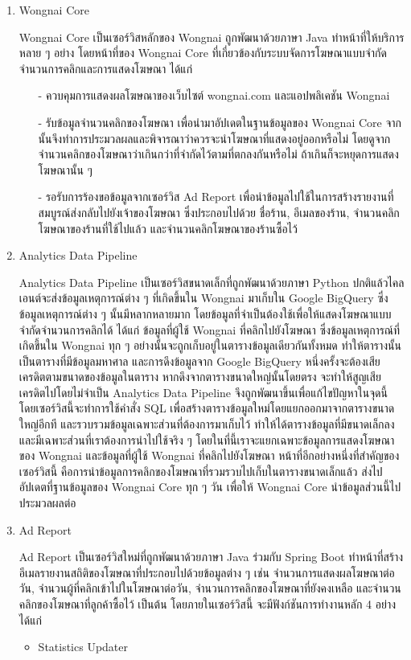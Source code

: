 \begin{enumerate}
	\item Wongnai Core
	
	Wongnai Core เป็นเซอร์วิสหลักของ Wongnai ถูกพัฒนาด้วยภาษา Java ทำหน้าที่ให้บริการหลาย ๆ อย่าง โดยหน้าที่ของ Wongnai Core ที่เกี่ยวข้องกับระบบจัดการโฆษณาแบบจำกัดจำนวนการคลิกและการแสดงโฆษณา ได้แก่ 
	\begin{itemize}
		\item[-] ควบคุมการแสดงผลโฆษณาของเว็บไซต์ wongnai.com และแอปพลิเคชัน Wongnai
		\item[-] รับข้อมูลจำนวนคลิกของโฆษณา เพื่อนำมาอัปเดตในฐานข้อมูลของ Wongnai Core จากนั้นจึงทำการประมวลผลและพิจารณาว่าควรจะนำโฆษณาที่แสดงอยู่ออกหรือไม่ โดยดูจากจำนวนคลิกของโฆษณาว่าเกินกว่าที่จำกัดไว้ตามที่ตกลงกันหรือไม่ ถ้าเกินก็จะหยุดการแสดงโฆษณานั้น ๆ
		\item[-] รอรับการร้องขอข้อมูลจากเซอร์วิส Ad Report เพื่อนำข้อมูลไปใช้ในการสร้างรายงานที่สมบูรณ์ส่งกลับไปยังเจ้าของโฆษณา ซึ่งประกอบไปด้วย ชื่อร้าน, อีเมลของร้าน, จำนวนคลิกโฆษณาของร้านที่ใช้ไปแล้ว และจำนวนคลิกโฆษณาของร้านซื้อไว้
	\end{itemize}
	\item Analytics Data Pipeline
	
	Analytics Data Pipeline เป็นเซอร์วิสขนาดเล็กที่ถูกพัฒนาด้วยภาษา Python ปกติแล้วไคลเอนต์จะส่งข้อมูลเหตุการณ์ต่าง ๆ ที่เกิดขึ้นใน Wongnai มาเก็บใน Google BigQuery ซึ่งข้อมูลเหตุการณ์ต่าง ๆ นั้นมีหลากหลายมาก โดยข้อมูลที่จำเป็นต้องใช้เพื่อให้แสดงโฆษณาแบบจำกัดจำนวนการคลิกได้ ได้แก่ ข้อมูลที่ผู้ใช้ Wongnai ที่คลิกไปยังโฆษณา ซึ่งข้อมูลเหตุการณ์ที่เกิดขึ้นใน Wongnai ทุก ๆ อย่างนั้นจะถูกเก็บอยู่ในตารางข้อมูลเดียวกันทั้งหมด ทำให้ตารางนั้นเป็นตารางที่มีข้อมูลมหาศาล และการดึงข้อมูลจาก Google BigQuery หนึ่งครั้งจะต้องเสียเครดิตตามขนาดของข้อมูลในตาราง หากดึงจากตารางขนาดใหญ่นั้นโดยตรง จะทำให้สูญเสียเครดิตไปโดยไม่จำเป็น Analytics Data Pipeline จึงถูกพัฒนาขึ้นเพื่อแก้ไขปัญหาในจุดนี้ โดยเซอร์วิสนี้จะทำการใช้คำสั่ง SQL เพื่อสร้างตารางข้อมูลใหม่โดยแยกออกมาจากตารางขนาดใหญ่อีกที และรวบรวมข้อมูลเฉพาะส่วนที่ต้องการมาเก็บไว้ ทำให้ได้ตารางข้อมูลที่มีขนาดเล็กลง และมีเฉพาะส่วนที่เราต้องการนำไปใช้จริง ๆ โดยในที่นี้เราจะแยกเฉพาะข้อมูลการแสดงโฆษณาของ Wongnai และข้อมูลที่ผู้ใช้ Wongnai ที่คลิกไปยังโฆษณา หน้าที่อีกอย่างหนึ่งที่สำคัญของเซอร์วิสนี้ คือการนำข้อมูลการคลิกของโฆษณาที่รวมรวบไปเก็บในตารางขนาดเล็กแล้ว ส่งไปอัปเดตที่ฐานข้อมูลของ Wongnai Core ทุก ๆ วัน เพื่อให้ Wongnai Core นำข้อมูลส่วนนี้ไปประมวลผลต่อ

	\item Ad Report
	
	Ad Report เป็นเซอร์วิสใหม่ที่ถูกพัฒนาด้วยภาษา Java ร่วมกับ Spring Boot ทำหน้าที่สร้างอีเมลรายงานสถิติของโฆษณาที่ประกอบไปด้วยข้อมูลต่าง ๆ เช่น จำนวนการแสดงผลโฆษณาต่อวัน, จำนวนผู้ที่คลิกเข้าไปในโฆษณาต่อวัน, จำนวนการคลิกของโฆษณาที่ยังคงเหลือ และจำนวนคลิกของโฆษณาที่ลูกค้าซื้อไว้ เป็นต้น โดยภายในเซอร์วิสนี้ จะมีฟังก์ชันการทำงานหลัก 4 อย่าง ได้แก่
	\begin{itemize}
		\item Statistics Updater
		

\end{itemize}
\end{enumerate}
